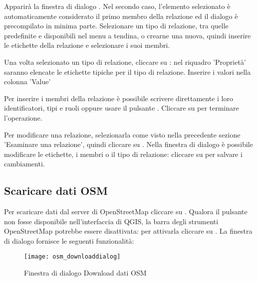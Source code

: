 Apparirà la finestra di dialogo . Nel secondo caso, l'elemento 
selezionato è automaticamente considerato il primo membro della relazione ed il dialogo è precompilato 
in minima parte.
Selezionare un tipo di relazione, tra quelle predefinite e disponibili nel menu a tendina, o crearne 
una nuova, quindi inserire le etichette della relazione e selezionare i suoi membri.

Una volta selezionato un tipo di relazione, cliccare su : 
nel riquadro 'Proprietà' saranno elencate le etichette tipiche per il tipo di relazione.
Inserire i valori nella colonna 'Value' 

Per inserire i membri della relazione è possibile scrivere direttamente i loro identificatori, tipi e ruoli 
oppure usare il pulsante . 
Cliccare su  per terminare l'operazione.


Per modificare una relazione, selezionarla come visto nella precedente sezione 'Esaminare una relazione', 
quindi cliccare su . Nella finestra di dialogo 
 è possibile modificare le etichette, i membri o il tipo di relazione: 
cliccare su  per salvare i cambiamenti.

\subsection{Scaricare dati OSM}

Per scaricare dati dal server di OpenStreetMap cliccare su . 
Qualora il pulsante non fosse disponibile nell'interfaccia di QGIS, la barra degli strumenti OpenStreetMap 
potrebbe essere disattivata: per attivarla cliccare su  \arrow
{} \arrow {}. La finestra di dialogo 
 fornisce le seguenti funzionalità:

\begin{figure}[ht]
   \centering
   \texttt{[image: osm\_downloaddialog]}
   \caption{Finestra di dialogo Download dati OSM \nixcaption}\label{fig:osmdownload}
\end{figure}

